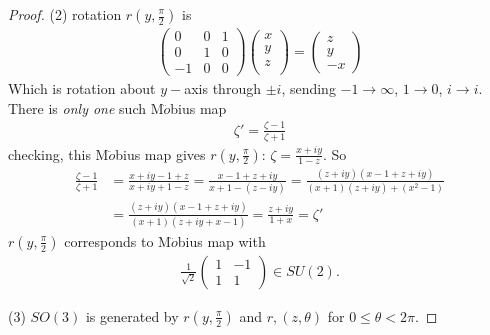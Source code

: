 \documentclass[a4paper]{article}
\begin{document}
\begin{thm}
\begin{proof}
(2) rotation $r(y,\frac{\pi}{2})$ is
\begin{equation*}
\begin{aligned}
\left(\begin{matrix}
0 & 0 & 1\\
0 & 1 & 0\\
-1 & 0 & 0
\end{matrix}\right) \left(\begin{matrix}
x\\
y\\
z\\
\end{matrix}\right) = \left(\begin{matrix}
z\\
y\\
-x
\end{matrix}\right)
\end{aligned}
\end{equation*}
Which is rotation about $y-$axis through $\pm i$, sending $-1 \to \infty$, $1 \to 0$, $i \to i$. There is \emph{only one} such M$\ddot{o}$bius map
\begin{equation*}
\begin{aligned}
\zeta' = \frac{\zeta - 1}{\zeta + 1}
\end{aligned}
\end{equation*}
checking, this M$\ddot{o}$bius map gives $r(y,\frac{\pi}{2})$: $\zeta = \frac{x+iy}{1-z}$. So
\begin{equation*}
\begin{aligned}
\frac{\zeta-1}{\zeta+1} &= \frac{x+iy-1+z}{x+iy+1-z} = \frac{x-1+z+iy}{x+1-(z-iy)} = \frac{(z+iy)(x-1+z+iy)}{(x+1)(z+iy)+(x^2-1)}\\
&=\frac{(z+iy)(x-1+z+iy)}{(x+1)(z+iy+x-1)} = \frac{z+iy}{1+x} = \zeta'
\end{aligned}
\end{equation*}
$r(y,\frac{\pi}{2})$ corresponds to M$\ddot{o}$bius map with 
\begin{equation*}
\begin{aligned}
\frac{1}{\sqrt{2}} \left(\begin{matrix}
1 & -1\\
1 & 1
\end{matrix}\right) \in SU(2).
\end{aligned}
\end{equation*}

(3) $SO(3)$ is generated by $r(y,\frac{\pi}{2})$ and $r,(z,\theta)$ for $0\leq \theta < 2\pi$.


\end{proof}
\end{thm}
\end{document}
